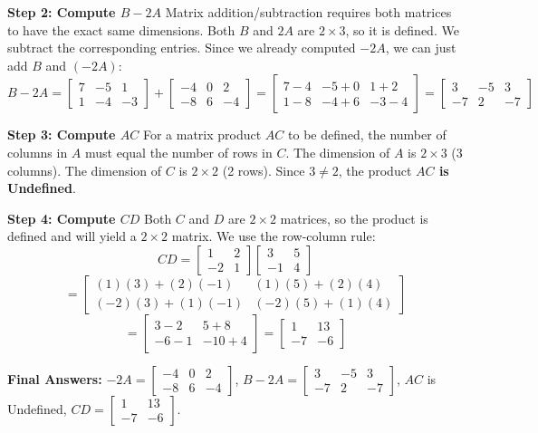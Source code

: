 \documentclass{article}
\begin{document}
\textbf{Step 2: Compute $B - 2A$}
Matrix addition/subtraction requires both matrices to have the exact same dimensions. Both $B$ and $2A$ are $2 \times 3$, so it is defined. We subtract the corresponding entries. Since we already computed $-2A$, we can just add $B$ and $(-2A)$:
\[ B - 2A = \begin{bmatrix} 7 & -5 & 1 \\ 1 & -4 & -3 \end{bmatrix} + \begin{bmatrix} -4 & 0 & 2 \\ -8 & 6 & -4 \end{bmatrix} = \begin{bmatrix} 7-4 & -5+0 & 1+2 \\ 1-8 & -4+6 & -3-4 \end{bmatrix} = \begin{bmatrix} 3 & -5 & 3 \\ -7 & 2 & -7 \end{bmatrix} \]

\textbf{Step 3: Compute $AC$}
For a matrix product $AC$ to be defined, the number of columns in $A$ must equal the number of rows in $C$.
The dimension of $A$ is $2 \times 3$ (3 columns).
The dimension of $C$ is $2 \times 2$ (2 rows).
Since $3 \neq 2$, the product \textbf{$AC$ is Undefined}.

\textbf{Step 4: Compute $CD$}
Both $C$ and $D$ are $2 \times 2$ matrices, so the product is defined and will yield a $2 \times 2$ matrix. We use the row-column rule:
\[ CD = \begin{bmatrix} 1 & 2 \\ -2 & 1 \end{bmatrix} \begin{bmatrix} 3 & 5 \\ -1 & 4 \end{bmatrix} \]
\[ = \begin{bmatrix} (1)(3) + (2)(-1) & (1)(5) + (2)(4) \\ (-2)(3) + (1)(-1) & (-2)(5) + (1)(4) \end{bmatrix} \]
\[ = \begin{bmatrix} 3 - 2 & 5 + 8 \\ -6 - 1 & -10 + 4 \end{bmatrix} = \begin{bmatrix} 1 & 13 \\ -7 & -6 \end{bmatrix} \]

\textbf{Final Answers:} 
$-2A = \begin{bmatrix} -4 & 0 & 2 \\ -8 & 6 & -4 \end{bmatrix}$, 
$B-2A = \begin{bmatrix} 3 & -5 & 3 \\ -7 & 2 & -7 \end{bmatrix}$, 
$AC$ is Undefined, 
$CD = \begin{bmatrix} 1 & 13 \\ -7 & -6 \end{bmatrix}$.
\end{document}
